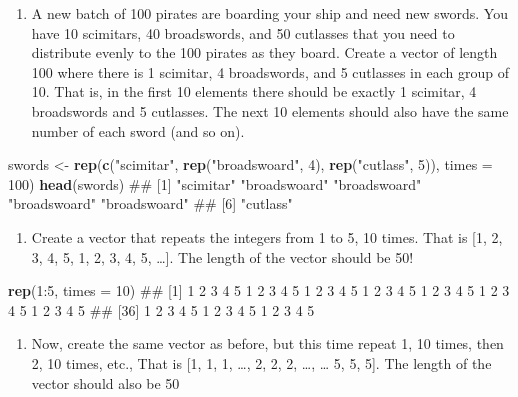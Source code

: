 \documentclass[]{book}
\newenvironment{Shaded}{\begin{snugshade}}{\end{snugshade}}
\newcommand{\KeywordTok}[1]{\textcolor[rgb]{0.13,0.29,0.53}{\textbf{{#1}}}}
\newcommand{\DataTypeTok}[1]{\textcolor[rgb]{0.13,0.29,0.53}{{#1}}}
\newcommand{\DecValTok}[1]{\textcolor[rgb]{0.00,0.00,0.81}{{#1}}}
\newcommand{\StringTok}[1]{\textcolor[rgb]{0.31,0.60,0.02}{{#1}}}
\newcommand{\NormalTok}[1]{{#1}}
\providecommand{\tightlist}{%
  \setlength{\itemsep}{0pt}\setlength{\parskip}{0pt}}
\theoremstyle{definition}
\theoremstyle{definition}
\theoremstyle{remark}
\begin{document}
\begin{enumerate}
\def\labelenumi{\arabic{enumi}.}
\setcounter{enumi}{4}
\tightlist
\item
  A new batch of 100 pirates are boarding your ship and need new swords.
  You have 10 scimitars, 40 broadswords, and 50 cutlasses that you need
  to distribute evenly to the 100 pirates as they board. Create a vector
  of length 100 where there is 1 scimitar, 4 broadswords, and 5
  cutlasses in each group of 10. That is, in the first 10 elements there
  should be exactly 1 scimitar, 4 broadswords and 5 cutlasses. The next
  10 elements should also have the same number of each sword (and so
  on).
\end{enumerate}

\begin{Shaded}
\begin{Highlighting}[]
\NormalTok{swords <-}\StringTok{ }\KeywordTok{rep}\NormalTok{(}\KeywordTok{c}\NormalTok{(}\StringTok{"scimitar"}\NormalTok{, }\KeywordTok{rep}\NormalTok{(}\StringTok{"broadswoard"}\NormalTok{, }\DecValTok{4}\NormalTok{), }\KeywordTok{rep}\NormalTok{(}\StringTok{"cutlass"}\NormalTok{, }\DecValTok{5}\NormalTok{)), }\DataTypeTok{times =} \DecValTok{100}\NormalTok{)}
\KeywordTok{head}\NormalTok{(swords)}
\NormalTok{## [1] "scimitar"    "broadswoard" "broadswoard" "broadswoard" "broadswoard"}
\NormalTok{## [6] "cutlass"}
\end{Highlighting}
\end{Shaded}

\begin{enumerate}
\def\labelenumi{\arabic{enumi}.}
\setcounter{enumi}{5}
\tightlist
\item
  Create a vector that repeats the integers from 1 to 5, 10 times. That
  is {[}1, 2, 3, 4, 5, 1, 2, 3, 4, 5, \ldots{}{]}. The length of the
  vector should be 50!
\end{enumerate}

\begin{Shaded}
\begin{Highlighting}[]
\KeywordTok{rep}\NormalTok{(}\DecValTok{1}\NormalTok{:}\DecValTok{5}\NormalTok{, }\DataTypeTok{times =} \DecValTok{10}\NormalTok{)}
\NormalTok{##  [1] 1 2 3 4 5 1 2 3 4 5 1 2 3 4 5 1 2 3 4 5 1 2 3 4 5 1 2 3 4 5 1 2 3 4 5}
\NormalTok{## [36] 1 2 3 4 5 1 2 3 4 5 1 2 3 4 5}
\end{Highlighting}
\end{Shaded}

\begin{enumerate}
\def\labelenumi{\arabic{enumi}.}
\setcounter{enumi}{6}
\tightlist
\item
  Now, create the same vector as before, but this time repeat 1, 10
  times, then 2, 10 times, etc., That is {[}1, 1, 1, \ldots{}, 2, 2, 2,
  \ldots{}, \ldots{} 5, 5, 5{]}. The length of the vector should also be
  50
\end{enumerate}
\end{document}
